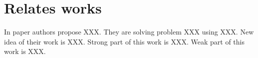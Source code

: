 \section{Relates works}\label{sec:OVERVIEW}


In paper \cite{jia2014caffe} authors propose XXX. They are solving problem XXX using XXX. New idea of their work is XXX. Strong part of this work is XXX. Weak part of this work is XXX.



